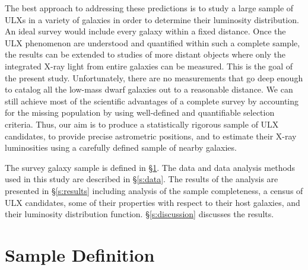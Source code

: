 \documentclass{article}
\begin{document}
The best approach to addressing these predictions
 is to study a large sample of ULXs in a variety of galaxies
in order to 
determine their luminosity distribution.
%
An ideal survey would
 include every galaxy within a fixed distance.
Once the ULX phenomenon are understood and quantified
within such a complete sample,
 the results can be extended to studies of more distant objects 
 where only the integrated X-ray light from entire galaxies 
 can be measured. 
This is the goal of the present study.
%
Unfortunately, there are no measurements that go deep enough
 to catalog all the low-mass dwarf galaxies out to a reasonable distance.
We can still achieve most of the scientific advantages of a complete survey
 by accounting for the missing population 
 by using well-defined and
 quantifiable selection criteria.
Thus, our aim is to produce a statistically rigorous sample of
 ULX candidates,
 to provide precise astrometric positions, and
 to estimate their X-ray luminosities
 using a carefully defined sample of nearby galaxies. 
 
The survey galaxy sample is defined in \S \ref{s:sample}.
The data and data analysis methods used in this study are described
in \S \ref{s:data}.
The results of the analysis are presented in \S \ref{s:results}
including analysis of the sample completeness,
a census of ULX candidates, some of their 
properties with respect to their host galaxies, and 
their luminosity distribution function. 
\S \ref{s:discussion} discusses the results.

\section{Sample Definition} \label{s:sample}
\end{document}
